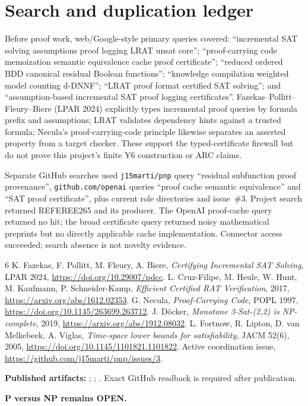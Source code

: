 \documentclass[11pt]{article}
\begin{document}
\section{Search and duplication ledger}
Before proof work, web/Google-style primary queries covered: ``incremental SAT solving assumptions proof logging LRAT unsat core''; ``proof-carrying code memoization semantic equivalence cache proof certificate''; ``reduced ordered BDD canonical residual Boolean functions''; ``knowledge compilation weighted model counting d-DNNF''; ``LRAT proof format certified SAT solving''; and ``assumption-based incremental SAT proof logging certificates''.  Fazekas--Pollitt--Fleury--Biere (LPAR 2024) explicitly types incremental proof queries by formula prefix and assumptions; LRAT validates dependency hints against a trusted formula; Necula's proof-carrying-code principle likewise separates an asserted property from a target checker.  These support the typed-certificate firewall but do not prove this project's finite Y6 construction or ARC claims.

Separate GitHub searches used \texttt{j15marti/pnp} query ``residual subfunction proof provenance'', \texttt{github.com/openai} queries ``proof cache semantic equivalence'' and ``SAT proof certificate'', plus current role directories and issue~\#3.  Project search returned REFEREE265 and its producer.  The OpenAI proof-cache query returned no hit; the broad certificate query returned noisy mathematical preprints but no directly applicable cache implementation.  Connector access succeeded; search absence is not novelty evidence.

\begin{thebibliography}{6}
 K. Fazekas, F. Pollitt, M. Fleury, A. Biere, \emph{Certifying Incremental SAT Solving}, LPAR 2024, \url{https://doi.org/10.29007/pdcc}.
 L. Cruz-Filipe, M. Heule, W. Hunt, M. Kaufmann, P. Schneider-Kamp, \emph{Efficient Certified RAT Verification}, 2017, \url{https://arxiv.org/abs/1612.02353}.
 G. Necula, \emph{Proof-Carrying Code}, POPL 1997, \url{https://doi.org/10.1145/263699.263712}.
 J. D\"ocker, \emph{Monotone 3-Sat-(2,2) is NP-complete}, 2019, \url{https://arxiv.org/abs/1912.08032}.
 L. Fortnow, R. Lipton, D. van Melkebeek, A. Viglas, \emph{Time-space lower bounds for satisfiability}, JACM 52(6), 2005, \url{https://doi.org/10.1145/1101821.1101822}.
 Active coordination issue, \url{https://github.com/j15marti/pnp/issues/3}.
\end{thebibliography}

\noindent\textbf{Published artifacts:} ; ; .  Exact GitHub readback is required after publication.

\noindent\textbf{P versus NP remains OPEN.}
\end{document}

